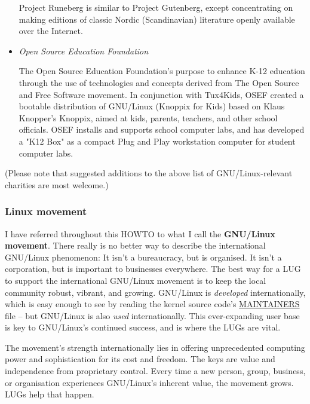 \documentclass{HOWTO}
\begin{document}
\begin{itemize}
Project Runeberg is similar to Project Gutenberg, except concentrating
on making editions of classic Nordic (Scandinavian) literature openly
available over the Internet.





\item  
\emph{Open Source Education Foundation} \texttt{\adturl}
 
The Open Source Education Foundation's purpose to enhance K-12 education
through the use of technologies and concepts derived from The Open
Source and Free Software movement.  In conjunction with Tux4Kids, OSEF 
created a bootable distribution of GNU/Linux (Knoppix for Kids) based 
on Klaus Knopper's Knoppix, aimed at kids, parents, teachers, and 
other school officials. OSEF installs and supports school computer labs, 
and has developed a "K12 Box" as a compact Plug and Play workstation 
computer for student computer labs.



\end{itemize}


(Please note that suggested additions to the above list of GNU/Linux-relevant 
charities are most welcome.)






\subsubsection{Linux movement}

I have referred throughout this HOWTO to what I call the {\bfseries GNU/Linux
movement}. There really is no better way to describe the
international GNU/Linux phenomenon: It isn't a bureaucracy, but is
organised. It isn't a corporation, but is important to businesses
everywhere. The best way for a LUG to support the international GNU/Linux
movement is to keep the local community robust, vibrant, and
growing. GNU/Linux is {\itshape developed\/} internationally, which is easy
enough to see by reading the kernel source code's 
\url{MAINTAINERS} file -- but
GNU/Linux is also {\itshape used\/} internationally.  This ever-expanding
user base is key to GNU/Linux's continued success, and is where the LUGs
are vital.

The movement's strength internationally lies in offering
unprecedented computing power and sophistication for its cost and
freedom. The keys are value and independence from proprietary control.
Every time a new person, group, business, or organisation experiences
GNU/Linux's inherent value, the movement grows.  LUGs help that
happen.
\end{document}
